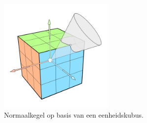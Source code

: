 \begin{figure}
  \centering
  \includegraphics[width=0.5\textwidth]{./img/raw/normal_cone.png}
  \caption{Normaalkegel op basis van een eenheidskubus.}
  \label{fig:cs-normal-cone}
\end{figure}
